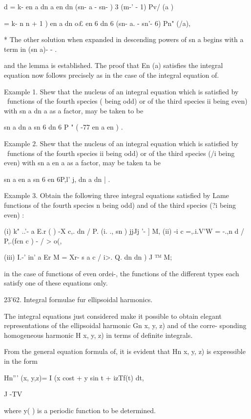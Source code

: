 {{{{{{{{d = k- en a dn a en dn (sn- a - sn- ) 3 (m-' - 1) Pv/ (a )

= k- n n + 1 ) en a dn o£ en 6 dn 6 (sn- a. - sn'- 6) Pn" (/a),

* The other solution when expanded in descending powers of sn a begins
with a term in (sn a)- - .

%
%

and the lemma is established. The proof that En (a) satisfies the
integral equation now follows precisely as in the case of the integral
equation of.

Example 1. Shew that the nucleus of an integral equation which is
satisfied by \Lame\ functions of the fourth species ( being odd) or of
the third species ii being even) with sn a dn a as a factor, may be
taken to be

sn a dn a sn 6 dn 6 P " ( -77 en a en ) .

Example 2. Shew that the nucleus of an integral equation which is
satisfied by \Lame\ functions of the fourth species ii being odd) or of
the third species (/i being even) with sn a en a as a factor, may be
taken ta be

sn a en a sn 6 en 6P,l' j, dn a dn | .

Example 3. Obtain the following three integral equations satisfied by
Lame functions of the fourth species n being odd) and of the third
species (?i being even) :

(i) k" ..'- a E.r ( ) -X c,. dn / P. (i. ., sn ) jjJj '- ] M, (ii) -i
c =,.i.V'W = -.,n d / P,.(fcn c ) - / > o(,

(iii) I.-' in' a Er M = Xr- s a c / i>. Q. dn dn ) J ™ M;

in the case of functions of even ordei-, the functions of the
different types each satisfy one of these equations only.

23'62. Integral formulae fur ellipsoidal harmonics.

The integral equations just considered make it possible to obtain
elegant representations of the ellipsoidal harmonic Gn x, y, z) and of
the corre- sponding homogeneous harmonic H x, y, z) in terms of
definite integrals.

From the general equation formula of, it is evident that Hn x,
y, z) is expressible in the form

Hn''' (x, y,z)= I (x cost + y sin t + izTf(t) dt,

J -TV

where y( ) is a periodic function to be determined.

}}}}}}}}
